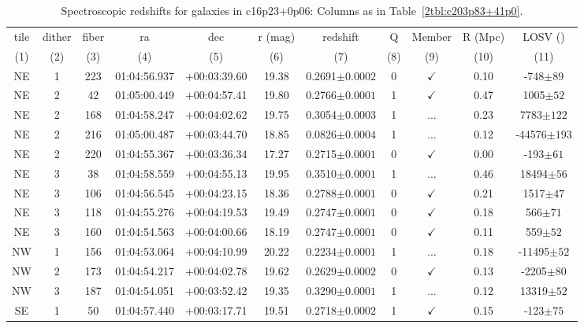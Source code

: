 \begin{landscape}
	\begin{table}
		\centering 
		\caption[Spectroscopic redshifts for galaxies in c16p23+0p06.]{Spectroscopic redshifts for galaxies in c16p23+0p06: Columns as in Table~\ref{2tbl:c203p83+41p0}.}
		\begin{tabular}{ccccccccccc}
			\hline
			tile & dither & fiber & ra & dec & r (mag) & redshift & Q & Member & R (Mpc) & LOSV (\kms) \\
			(1) & (2) & (3) & (4) & (5) & (6) & (7) & (8) & (9) & (10) & (11) \\
			\hline \hline
			NE & 1 & 223 & 01:04:56.937 & +00:03:39.60 & 19.38 & 0.2691$\pm{0.0002}$ & 0 & $\checkmark$ & 0.10 & -748$\pm{89}$ \\
			NE & 2 & 42 & 01:05:00.449 & +00:04:57.41 & 19.80 & 0.2766$\pm{0.0001}$ & 1 & $\checkmark$ & 0.47 & 1005$\pm{52}$ \\
			NE & 2 & 168 & 01:04:58.247 & +00:04:02.62 & 19.75 & 0.3054$\pm{0.0003}$ & 1 & ... & 0.23 & 7783$\pm{122}$ \\
			NE & 2 & 216 & 01:05:00.487 & +00:03:44.70 & 18.85 & 0.0826$\pm{0.0004}$ & 1 & ... & 0.12 & -44576$\pm{193}$ \\
			NE & 2 & 220 & 01:04:55.367 & +00:03:36.34 & 17.27 & 0.2715$\pm{0.0001}$ & 0 & $\checkmark$ & 0.00 & -193$\pm{61}$ \\
			NE & 3 & 38 & 01:04:58.559 & +00:04:55.13 & 19.95 & 0.3510$\pm{0.0001}$ & 1 & ... & 0.46 & 18494$\pm{56}$ \\
			NE & 3 & 106 & 01:04:56.545 & +00:04:23.15 & 18.36 & 0.2788$\pm{0.0001}$ & 0 & $\checkmark$ & 0.21 & 1517$\pm{47}$ \\
			NE & 3 & 118 & 01:04:55.276 & +00:04:19.53 & 19.49 & 0.2747$\pm{0.0001}$ & 0 & $\checkmark$ & 0.18 & 566$\pm{71}$ \\
			NE & 3 & 160 & 01:04:54.563 & +00:04:00.66 & 18.19 & 0.2747$\pm{0.0001}$ & 0 & $\checkmark$ & 0.11 & 559$\pm{52}$ \\
			NW & 1 & 156 & 01:04:53.064 & +00:04:10.99 & 20.22 & 0.2234$\pm{0.0001}$ & 1 & ... & 0.18 & -11495$\pm{52}$ \\
			NW & 2 & 173 & 01:04:54.217 & +00:04:02.78 & 19.62 & 0.2629$\pm{0.0002}$ & 0 & $\checkmark$ & 0.13 & -2205$\pm{80}$ \\
			NW & 3 & 187 & 01:04:54.051 & +00:03:52.42 & 19.35 & 0.3290$\pm{0.0001}$ & 1 & ... & 0.12 & 13319$\pm{52}$ \\
			SE & 1 & 50 & 01:04:57.440 & +00:03:17.71 & 19.51 & 0.2718$\pm{0.0002}$ & 1 & $\checkmark$ & 0.15 & -123$\pm{75}$ \\

\end{tabular}
\end{table}
\end{landscape}

